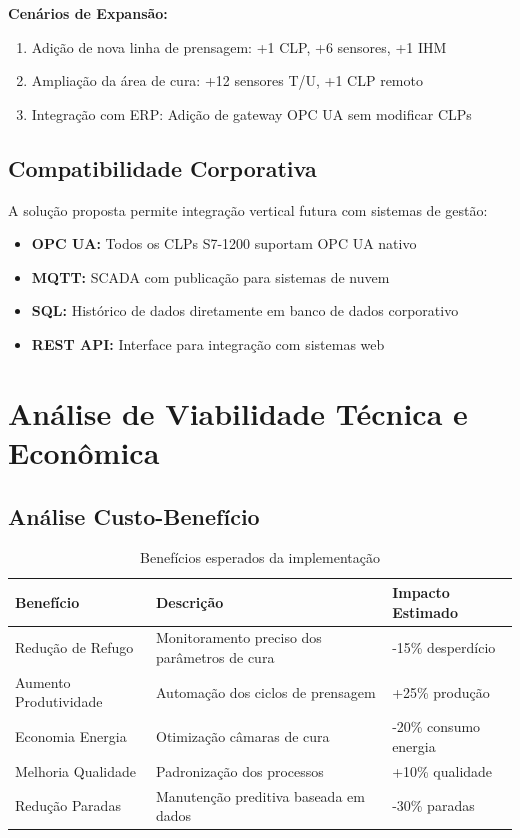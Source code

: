 \documentclass[12pt,a4paper]{article}
\begin{document}
\textbf{Cenários de Expansão:}
\begin{enumerate}
    \item Adição de nova linha de prensagem: +1 CLP, +6 sensores, +1 IHM
    \item Ampliação da área de cura: +12 sensores T/U, +1 CLP remoto
    \item Integração com ERP: Adição de gateway OPC UA sem modificar CLPs
\end{enumerate}

\subsection{Compatibilidade Corporativa}

A solução proposta permite integração vertical futura com sistemas de gestão:

\begin{itemize}
    \item \textbf{OPC UA:} Todos os CLPs S7-1200 suportam OPC UA nativo
    \item \textbf{MQTT:} SCADA com publicação para sistemas de nuvem
    \item \textbf{SQL:} Histórico de dados diretamente em banco de dados corporativo
    \item \textbf{REST API:} Interface para integração com sistemas web
\end{itemize}

\section{Análise de Viabilidade Técnica e Econômica}

\subsection{Análise Custo-Benefício}

\begin{table}[h]
\centering
\begin{tabular}{@{}p{5cm}|p{5cm}|p{4cm}@{}}
\toprule
\textbf{Benefício} & \textbf{Descrição} & \textbf{Impacto Estimado} \\
\midrule
Redução de Refugo & Monitoramento preciso dos parâmetros de cura & -15\% desperdício \\
\midrule
Aumento Produtividade & Automação dos ciclos de prensagem & +25\% produção \\
\midrule
Economia Energia & Otimização câmaras de cura & -20\% consumo energia \\
\midrule
Melhoria Qualidade & Padronização dos processos & +10\% qualidade \\
\midrule
Redução Paradas & Manutenção preditiva baseada em dados & -30\% paradas \\
\bottomrule
\end{tabular}
\caption{Benefícios esperados da implementação}
\end{table}
\end{document}
